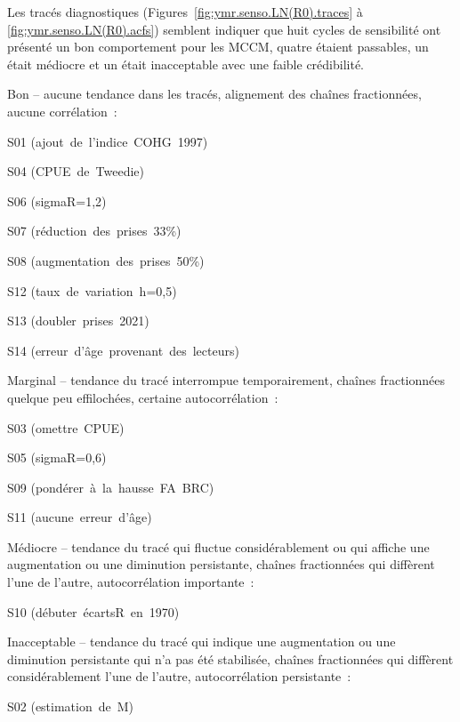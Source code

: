 \documentclass[11pt]{book}
\begin{document}
Les trac\'{e}s diagnostiques (Figures~\ref{fig:ymr.senso.LN(R0).traces} \`{a} \ref{fig:ymr.senso.LN(R0).acfs}) semblent indiquer que huit cycles de sensibilit\'{e} ont pr\'{e}sent\'{e} un bon comportement pour les MCCM, quatre \'{e}taient passables, un \'{e}tait m\'{e}diocre et un \'{e}tait inacceptable avec une faible cr\'{e}dibilit\'{e}.
\begin{itemize_csas}{}{}
  \item Bon -- aucune tendance dans les trac\'{e}s, alignement des cha\^{i}nes fractionn\'{e}es, aucune corr\'{e}lation~:
  \begin{itemize_csas}{}{}
    \item S01 (ajout~de~l'indice~COHG~1997)
    \item S04 (CPUE~de~Tweedie)
    \item S06 (sigmaR=1,2)
    \item S07 (r\'{e}duction~des~prises~33\%)
    \item S08 (augmentation~des~prises~50\%)
    \item S12 (taux~de~variation~h=0,5)
    \item S13 (doubler~prises~2021)
    \item S14 (erreur~d'\^{a}ge~provenant~des~lecteurs)
  \end{itemize_csas}
  \item Marginal -- tendance du trac\'{e} interrompue temporairement, cha\^{i}nes fractionn\'{e}es quelque peu effiloch\'{e}es, certaine autocorr\'{e}lation~:
  \begin{itemize_csas}{}{}
    \item S03 (omettre~CPUE)
    \item S05 (sigmaR=0,6)
    \item S09 (pond\'{e}rer~\`{a}~la~hausse~FA~BRC)
    \item S11 (aucune~erreur~d'\^{a}ge)
  \end{itemize_csas}
  \item M\'{e}diocre -- tendance du trac\'{e} qui fluctue consid\'{e}rablement ou qui affiche une augmentation ou une diminution persistante, cha\^{i}nes fractionn\'{e}es qui diff\`{e}rent l'une de l'autre, autocorr\'{e}lation importante~:
  \begin{itemize_csas}{}{}
    \item S10 (d\'{e}buter~\'{e}cartsR~en~1970)
  \end{itemize_csas}
  \item Inacceptable -- tendance du trac\'{e} qui indique une augmentation ou une diminution persistante qui n'a pas \'{e}t\'{e} stabilis\'{e}e, cha\^{i}nes fractionn\'{e}es qui diff\`{e}rent consid\'{e}rablement l'une de l'autre, autocorr\'{e}lation persistante~:
  \begin{itemize_csas}{}{}
    \item S02 (estimation~de~M)
  \end{itemize_csas}
\end{itemize_csas}
\end{document}

